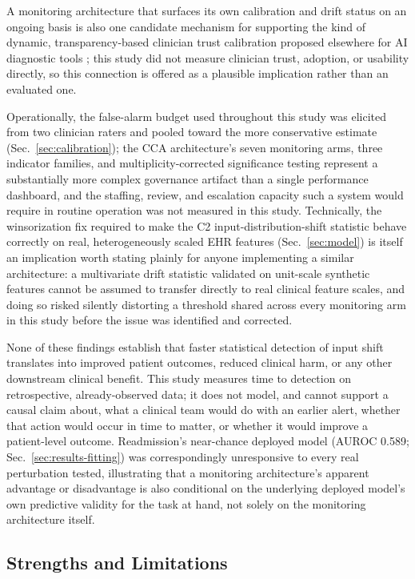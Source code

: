 \documentclass[apajournal,article,submit,oneauthor]{Definitions/mdpi}
\begin{document}
A monitoring architecture that surfaces its own calibration and drift status on an ongoing basis is also one candidate mechanism for supporting the kind of dynamic, transparency-based clinician trust calibration proposed elsewhere for AI diagnostic tools \citep{yu2025trust}; this study did not measure clinician trust, adoption, or usability directly, so this connection is offered as a plausible implication rather than an evaluated one.

Operationally, the false-alarm budget used throughout this study was elicited from two clinician raters and pooled toward the more conservative estimate (Sec.~\ref{sec:calibration}); the CCA architecture's seven monitoring arms, three indicator families, and multiplicity-corrected significance testing represent a substantially more complex governance artifact than a single performance dashboard, and the staffing, review, and escalation capacity such a system would require in routine operation was not measured in this study. Technically, the winsorization fix required to make the C2 input-distribution-shift statistic behave correctly on real, heterogeneously scaled EHR features (Sec.~\ref{sec:model}) is itself an implication worth stating plainly for anyone implementing a similar architecture: a multivariate drift statistic validated on unit-scale synthetic features cannot be assumed to transfer directly to real clinical feature scales, and doing so risked silently distorting a threshold shared across every monitoring arm in this study before the issue was identified and corrected.

None of these findings establish that faster statistical detection of input shift translates into improved patient outcomes, reduced clinical harm, or any other downstream clinical benefit. This study measures time to detection on retrospective, already-observed data; it does not model, and cannot support a causal claim about, what a clinical team would do with an earlier alert, whether that action would occur in time to matter, or whether it would improve a patient-level outcome. Readmission's near-chance deployed model (AUROC 0.589; Sec.~\ref{sec:results-fitting}) was correspondingly unresponsive to every real perturbation tested, illustrating that a monitoring architecture's apparent advantage or disadvantage is also conditional on the underlying deployed model's own predictive validity for the task at hand, not solely on the monitoring architecture itself.

\subsection{Strengths and Limitations}\label{sec:disc-limitations}
\end{document}
